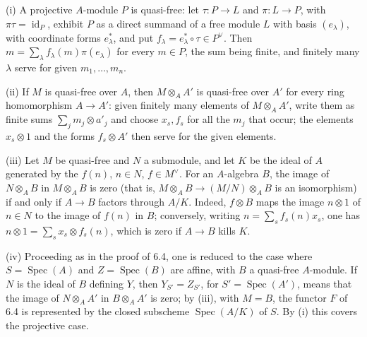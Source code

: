(i) A projective \(A\)-module \(P\) is quasi-free: let \(\tau:P\to L\) and \(\pi:L\to P\), with
\(\pi\tau=\operatorname{id}_P\), exhibit \(P\) as a direct summand of a free module \(L\) with basis
\((e_\lambda)\), with coordinate forms \(e^*_\lambda\), and put
\(f_\lambda=e^*_\lambda\circ\tau\in P^\vee\). Then \(m=\sum_\lambda f_\lambda(m)\pi(e_\lambda)\) for
every \(m\in P\), the sum being finite, and finitely many \(\lambda\) serve for given
\(m_1,\ldots,m_n\).

(ii) If \(M\) is quasi-free over \(A\), then \(M\otimes_AA'\) is quasi-free over \(A'\) for every
ring homomorphism \(A\to A'\): given finitely many elements of \(M\otimes_AA'\), write them as finite
sums \(\sum_jm_j\otimes a'_j\) and choose \(x_s,f_s\) for all the \(m_j\) that occur; the
elements \(x_s\otimes1\) and the forms \(f_s\otimes A'\) then serve for the given elements.

(iii) Let \(M\) be quasi-free and \(N\) a submodule, and let \(K\) be the ideal of \(A\) generated by
the \(f(n)\), \(n\in N\), \(f\in M^\vee\). For an \(A\)-algebra \(B\), the image of
\(N\otimes_AB\) in \(M\otimes_AB\) is zero (that is, \(M\otimes_AB\to(M/N)\otimes_AB\) is an
isomorphism) if and only if \(A\to B\) factors through \(A/K\). Indeed, \(f\otimes B\) maps the image
\(n\otimes1\) of \(n\in N\) to the image of \(f(n)\) in \(B\); conversely, writing
\(n=\sum_sf_s(n)x_s\), one has \(n\otimes1=\sum_sx_s\otimes f_s(n)\), which is zero if \(A\to B\)
kills \(K\).

(iv) Proceeding as in the proof of 6.4, one is reduced to the case where \(S=\operatorname{Spec}(A)\)
and \(Z=\operatorname{Spec}(B)\) are affine, with \(B\) a quasi-free \(A\)-module. If \(N\) is the
ideal of \(B\) defining \(Y\), then \(Y_{S'}=Z_{S'}\), for \(S'=\operatorname{Spec}(A')\), means that
the image of \(N\otimes_AA'\) in \(B\otimes_AA'\) is zero; by (iii), with \(M=B\), the functor \(F\)
of 6.4 is represented by the closed subscheme \(\operatorname{Spec}(A/K)\) of \(S\). By (i) this
covers the projective case.
